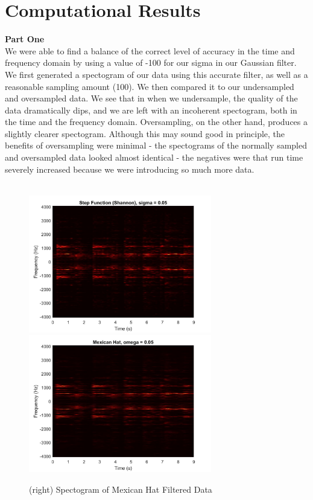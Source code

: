 \documentclass{article}
\begin{document}
\section*{\fontsize{19}{15}\selectfont Computational Results}
	\textbf{Part One} \\
	We were able to find a balance of the correct level of accuracy in the time and frequency domain by using a value of -100 for our sigma in our Gaussian filter. We first generated a spectogram of our data using this accurate filter, as well as a reasonable sampling amount (100). We then compared it to our undersampled and oversampled data. We see that in when we undersample, the quality of the data dramatically dips, and we are left with an incoherent spectogram, both in the time and the frequency domain. Oversampling, on the other hand, produces a slightly clearer spectogram. Although this may sound good in principle, the benefits of oversampling were minimal - the spectograms of the normally sampled and oversampled data looked almost identical - the negatives were that run time severely increased because we were introducing so much more data.\\ \\
\begin{figure}[h]
\begin{center}
\includegraphics[width = 8cm]{shannon}
\includegraphics[width = 8cm]{mxhat}
\caption{\label{fig:scaled_diss} (left) Spectogram of Shannon Filtered Data}
\caption{\label{fig:scaled_diss} (right) Spectogram of Mexican Hat Filtered Data}
\end{center}
\end{figure}
\end{document}
